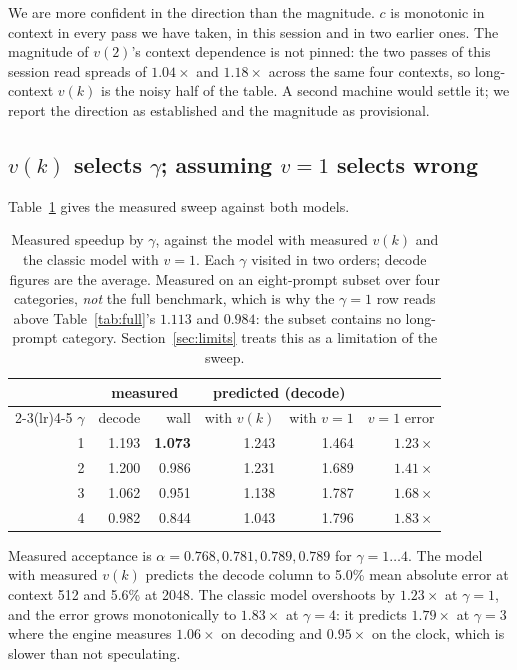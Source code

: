 \documentclass[conference]{IEEEtran}
\begin{document}
We are more confident in the direction than the magnitude. $c$ is monotonic in context in every pass
we have taken, in this session and in two earlier ones. The magnitude of $v(2)$'s context dependence
is not pinned: the two passes of this session read spreads of $1.04\times$ and $1.18\times$ across the
same four contexts, so long-context $v(k)$ is the noisy half of the table. A second machine would
settle it; we report the direction as established and the magnitude as provisional.

\subsection{$v(k)$ selects $\gamma$; assuming $v=1$ selects wrong}
\label{sec:gamma}

Table~\ref{tab:gamma} gives the measured sweep against both models.

\begin{table}[t]
\caption{Measured speedup by $\gamma$, against the model with measured $v(k)$ and the classic model
with $v = 1$. Each $\gamma$ visited in two orders; decode figures are the average. Measured on an
eight-prompt subset over four categories, \emph{not} the full benchmark, which is why the
$\gamma=1$ row reads above Table~\ref{tab:full}'s $1.113$ and $0.984$: the subset contains no
long-prompt category. Section~\ref{sec:limits} treats this as a limitation of the sweep.}
\label{tab:gamma}
\centering
\begin{tabular}{@{}rrrrrr@{}}
\toprule
& \multicolumn{2}{c}{measured} & \multicolumn{2}{c}{predicted (decode)} & \\
\cmidrule(lr){2-3}\cmidrule(lr){4-5}
$\gamma$ & decode & wall & with $v(k)$ & with $v=1$ & $v=1$ error \\
\midrule
1 & 1.193 & \textbf{1.073} & 1.243 & 1.464 & $1.23\times$ \\
2 & 1.200 & 0.986 & 1.231 & 1.689 & $1.41\times$ \\
3 & 1.062 & 0.951 & 1.138 & 1.787 & $1.68\times$ \\
4 & 0.982 & 0.844 & 1.043 & 1.796 & $1.83\times$ \\
\bottomrule
\end{tabular}
\end{table}

Measured acceptance is $\alpha = 0.768, 0.781, 0.789, 0.789$ for $\gamma = 1 \ldots 4$. The model
with measured $v(k)$ predicts the decode column to 5.0\% mean absolute error at context 512 and 5.6\%
at 2048. The classic model overshoots by $1.23\times$ at $\gamma=1$, and the error grows monotonically
to $1.83\times$ at $\gamma=4$: it predicts $1.79\times$ at $\gamma=3$ where the engine measures
$1.06\times$ on decoding and $0.95\times$ on the clock, which is slower than not speculating.
\end{document}
